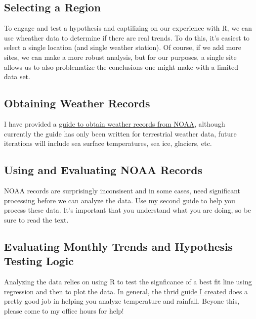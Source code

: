 \documentclass{tufte-handout}\usepackage[]{graphicx}\usepackage[]{color}
\begin{document}
\subsection{Selecting a Region}

To engage and test a hypothesis and captilizing on our experience with R, we can use wheather data to determine if there are real trends. To do this, it's easiest to select a single location (and single weather station). Of course, if we add more sites, we can make a more robust analysis, but for our purposes, a single site allows us to also problematize the conclusions one might make with a limited data set. 

\subsection{Obtaining Weather Records}

I have provided a \href{https://github.com/marclos/Climate_Change_Narratives/raw/master/Analysis_Resources/1_Obtaining_Climate_Records.pdf}{guide to obtain weather records from NOAA}, although currently the guide has only been written for terrestrial weather data, future iterations will include sea surface temperatures, sea ice, glaciers, etc. 

\subsection{Using and Evaluating NOAA Records}

NOAA records are surprisingly inconsisent and in some cases, need significant processing before we can analyze the data. Use \href{https://github.com/marclos/Climate_Change_Narratives/raw/master/Analysis_Resources/2_Using_NOAA_Climate_Records.pdf}{my second guide} to help you process these data. It's important that you understand what you are doing, so be sure to read the text.

\subsection{Evaluating Monthly Trends and Hypothesis Testing Logic}

Analyzing the data relies on using R to test the signficance of a best fit line using regression and then to plot the data. In general, the \href{https://github.com/marclos/Climate_Change_Narratives/blob/master/Analysis_Resources/3_Evaluating_Monthly_Trends_CHCNDaily.pdf}{thrid guide I created} does a pretty good job in helping you analyze temperature and rainfall. Beyone this, please come to my office hours for help!
\end{document}
